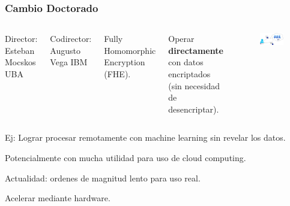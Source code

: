 \documentclass[handout]{beamer}
\begin{document}
\begin{frame}
\frametitle{Cambio Doctorado}
        \vspace{0.3cm}

\begin{columns}
        Director: Esteban Mocskos UBA
        \vspace{0.3cm}

        Codirector: Augusto Vega IBM

        \vspace{0.3cm}
        Fully Homomorphic Encryption (FHE).

        \vspace{0.3cm}
        Operar \textbf{directamente} con datos encriptados (sin necesidad de desencriptar).


\begin{figure}[h!]
    \centering
    \includegraphics[scale=0.19]{fhe.jpg}
\end{figure}
\end{columns}


Ej: Lograr procesar remotamente con machine learning sin revelar los datos.
 \vspace{-0.25cm}

Potencialmente con mucha utilidad para uso de cloud computing.
 \vspace{-0.15cm}

Actualidad: ordenes de magnitud lento para uso real.
 \vspace{-0.15cm}

\begin{mdframed}[backgroundcolor=frenchblue!20]\centering
  Acelerar mediante hardware.
\end{mdframed}

\end{frame}


\end{document}
